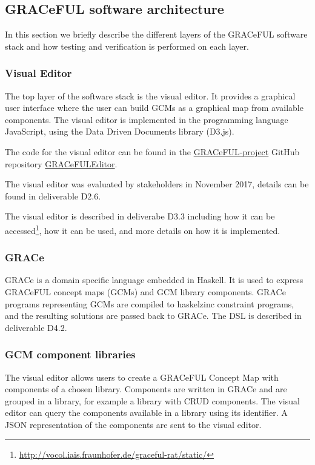 \documentclass{article}
\begin{document}
\subsection{GRACeFUL software architecture}
In this section we briefly describe the different layers of
the GRACeFUL software stack and how testing and
verification is performed on each layer.

\subsubsection*{Visual Editor}

The top layer of the software stack is the visual editor.
%
It provides a graphical user interface where the user can build GCMs
as a graphical map from available components.
%
The visual editor is implemented in the programming language JavaScript, using
the Data Driven Documents library (D3.js).
%

The code for the visual editor can be found in the
\href{https://github.com/GRACeFUL-project}{GRACeFUL-project} GitHub
repository
\href{https://github.com/GRACeFUL-project/GRACeFULEditor}{GRACeFULEditor}.

The visual editor was evaluated by stakeholders in November 2017, details can be
found in deliverable D2.6.

The visual editor is described in deliverabe D3.3 including how it can be
accessed\footnote{\url{http://vocol.iais.fraunhofer.de/graceful-rat/static/}},
how it can be used, and more details on how it is implemented.

\subsubsection*{GRACe}

GRACe is a domain specific language embedded in Haskell. It is used to express
GRACeFUL concept maps (GCMs) and GCM library components. GRACe programs
representing GCMs are compiled to haskelzinc constraint programs, and the
resulting solutions are passed back to GRACe. The DSL is described in deliverable
D4.2.

\subsubsection*{GCM component libraries}

The visual editor allows users to create a GRACeFUL Concept Map with components
of a chosen library. Components are written in GRACe and are grouped in a
library, for example a library with CRUD components. The visual editor can query
the components available in a library using its identifier. A JSON
representation of the components are sent to the visual editor.
\end{document}
